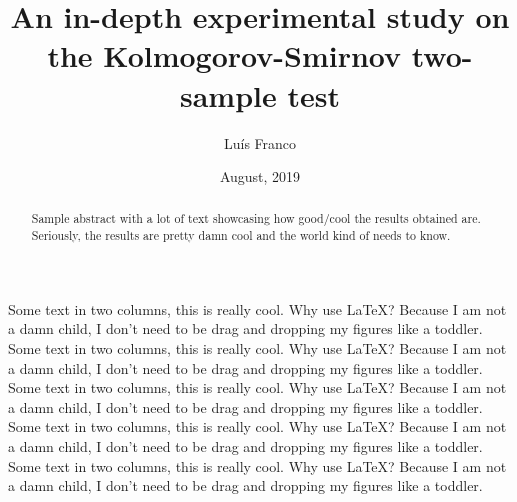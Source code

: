 \documentclass{article}
\title{An in-depth experimental study on the Kolmogorov-Smirnov two-sample test}
\date{August, 2019}
\author{Luís Franco}
\begin{document}
	\maketitle

	\begin{abstract}

		Sample abstract with a lot of text showcasing how good/cool the results obtained are. Seriously, the results are pretty damn cool and the world kind of needs to know.

	\end{abstract}

	\begin{multicols}{2}

	Some text in two columns, this is really cool. Why use LaTeX? Because I am not a damn child, I don't need to be drag and dropping my figures like a toddler. Some text in two columns, this is really cool. Why use LaTeX? Because I am not a damn child, I don't need to be drag and dropping my figures like a toddler. Some text in two columns, this is really cool. Why use LaTeX? Because I am not a damn child, I don't need to be drag and dropping my figures like a toddler. Some text in two columns, this is really cool. Why use LaTeX? Because I am not a damn child, I don't need to be drag and dropping my figures like a toddler. Some text in two columns, this is really cool. Why use LaTeX? Because I am not a damn child, I don't need to be drag and dropping my figures like a toddler.





	\end{multicols}
\end{document}
